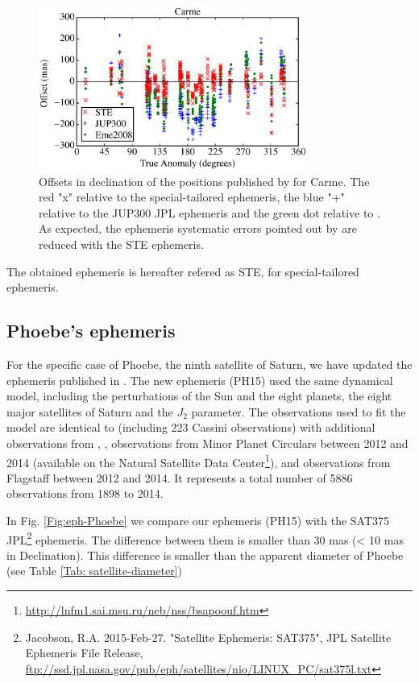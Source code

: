\documentclass[useAMS,usenatbib]{mn2e}
\begin{document}
\begin{figure}
\includegraphics[width=8.8cm]{figures/Carme_ephemeris.eps}
\caption{Offsets in declination of the positions published by \protect\cite{GomesJunior2015} for Carme. The red "x" relative to the special-tailored ephemeris, the blue "+" relative to the JUP300 JPL ephemeris and the green dot relative to \protect\cite{Emelyanov2008}. As expected, the ephemeris systematic errors pointed out by \protect\cite{GomesJunior2015} are reduced with the STE ephemeris. \label{Fig: JPL-STE}}
\end{figure}

The obtained ephemeris is hereafter refered as STE, for special-tailored ephemeris.

\subsection{Phoebe's ephemeris}

For the specific case of Phoebe, the ninth satellite of Saturn, we have updated the ephemeris published in \cite{Desmars2013}. The new ephemeris (PH15) used the same dynamical model, including the perturbations of the Sun and the eight planets, the eight major satellites of Saturn and the $J_2$ parameter. The observations used to fit the model are identical to \cite{Desmars2013} (including 223 Cassini observations) with additional observations from \cite{GomesJunior2015}, \cite{Peng2015}, observations from Minor Planet Circulars between 2012 and 2014 (available on the Natural Satellite Data Center\footnote{\url{http://lnfm1.sai.msu.ru/neb/nss/bsapoouf.htm}}), and observations from Flagstaff \citep{NOFS} between 2012 and 2014. It represents a total number of 5886 observations from 1898 to 2014.

In Fig. \ref{Fig:eph-Phoebe} we compare our ephemeris (PH15) with the SAT375 JPL\footnote{Jacobson, R.A. 2015-Feb-27. "Satellite Ephemeris: SAT375", JPL Satellite Ephemeris File Release, \url{ftp://ssd.jpl.nasa.gov/pub/eph/satellites/nio/LINUX_PC/sat375l.txt}} ephemeris. The difference between them is smaller than 30 mas (< 10 mas in Declination). This difference is smaller than the apparent diameter of Phoebe (see Table \ref{Tab: satellite-diameter})
\end{document}
